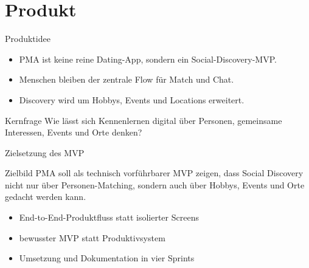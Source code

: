 \documentclass[
amberg,
compressedtitleimages,
toc=fancy,
footlinebox,
nometaot
]{OTHAWbeamer}
\begin{document}
\section{Produkt}

\begin{frame}{Produktidee}
  \begin{itemize}
    \item PMA ist keine reine Dating-App, sondern ein Social-Discovery-MVP.
    \item Menschen bleiben der zentrale Flow für Match und Chat.
    \item Discovery wird um Hobbys, Events und Locations erweitert.
  \end{itemize}

  \vspace{0.3cm}

  \begin{block}{Kernfrage}
    Wie lässt sich Kennenlernen digital über Personen, gemeinsame Interessen, Events und Orte denken?
  \end{block}
\end{frame}

\begin{frame}{Zielsetzung des MVP}
  \begin{block}{Zielbild}
    PMA soll als technisch vorführbarer MVP zeigen, dass Social Discovery nicht nur über Personen-Matching, sondern auch über Hobbys, Events und Orte gedacht werden kann.
  \end{block}

  \vspace{0.3cm}

  \begin{itemize}
    \item End-to-End-Produktfluss statt isolierter Screens
    \item bewusster MVP statt Produktivsystem
    \item Umsetzung und Dokumentation in vier Sprints
  \end{itemize}
\end{frame}
\end{document}
